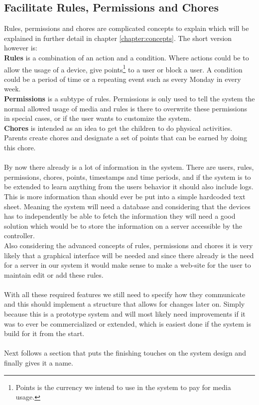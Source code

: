 \subsection{Facilitate Rules, Permissions and Chores}
Rules, permissions and chores are complicated concepts to explain which will be explained in further detail in chapter \ref{chapter:concepts}. The short version however is:\\
\textbf{Rules} is a combination of an action and a condition. Where actions could be to allow the usage of a device, give points\footnote{Points is the currency we intend to use in the system to pay for media usage.} to a user or block a user. A condition could be a period of time or a repeating event such as every Monday in every week.\\
\textbf{Permissions} is a subtype of rules. Permissions is only used to tell the system the normal allowed usage of media and rules is there to overwrite these permissions in special cases, or if the user wants to customize the system.\\
\textbf{Chores} is intended as an idea to get the children to do physical activities. Parents create chores and designate a set of points that can be earned by doing this chore.\\
\\
By now there already is a lot of information in the system. There are users, rules, permissions, chores, points, timestamps and time periods, and if the system is to be extended to learn anything from the users behavior it should also include logs.\\
This is more information than should ever be put into a simple hardcoded text sheet. Meaning the system will need a database and considering that the devices has to independently be able to fetch the information they will need a good solution which would be to store the information on a server accessible by the controller.\\
Also considering the advanced concepts of rules, permissions and chores it is very likely that a graphical interface will be needed and since there already is the need for a server in our system it would make sense to make a web-site for the user to maintain edit or add these rules.\\
\\
With all these required features we still need to specify how they communicate and this should implement a structure that allows for changes later on. Simply because this is a prototype system and will most likely need improvements if it was to ever be commercialized or extended, which is easiest done if the system is build for it from the start.\\
\\
Next follows a section that puts the finishing touches on the system design and finally gives it a name.



